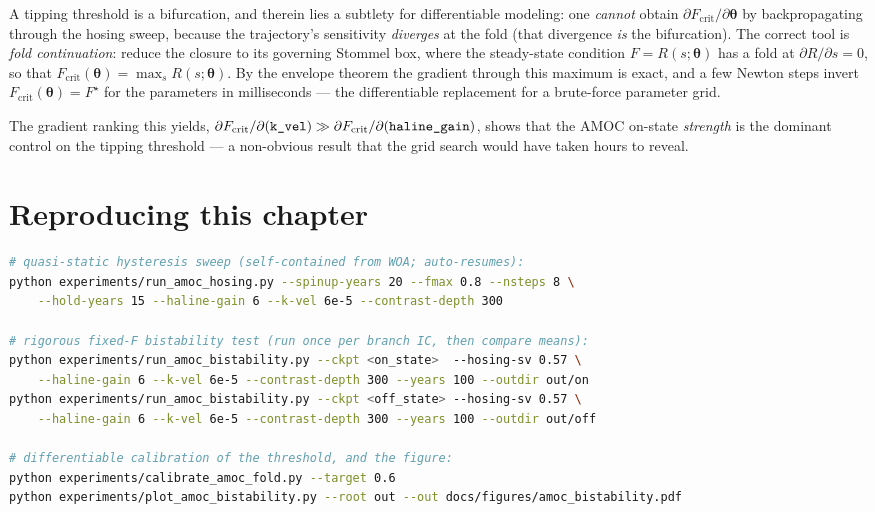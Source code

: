 A tipping threshold is a bifurcation, and therein lies a subtlety for differentiable modeling:
one \emph{cannot} obtain $\partial F_{\mathrm{crit}}/\partial\boldsymbol{\theta}$ by
backpropagating through the hosing sweep, because the trajectory's sensitivity \emph{diverges} at
the fold (that divergence \emph{is} the bifurcation). The correct tool is \emph{fold
continuation}: reduce the closure to its governing Stommel box, where the steady-state condition
$F = R(s;\boldsymbol{\theta})$ has a fold at $\partial R/\partial s=0$, so that
$F_{\mathrm{crit}}(\boldsymbol{\theta}) = \max_s R(s;\boldsymbol{\theta})$. By the envelope
theorem the gradient through this maximum is exact, and a few Newton steps invert
$F_{\mathrm{crit}}(\boldsymbol{\theta})=F^\star$ for the parameters in milliseconds --- the
differentiable replacement for a brute-force parameter grid.

\noindent
The gradient ranking this yields,
$\partial F_{\mathrm{crit}}/\partial(\texttt{k\_vel}) \gg
 \partial F_{\mathrm{crit}}/\partial(\texttt{haline\_gain})$,
shows that the AMOC on-state \emph{strength} is the dominant control on the tipping threshold ---
a non-obvious result that the grid search would have taken hours to reveal.

\section{Reproducing this chapter}

\begin{lstlisting}[language=bash,caption={Hosing sweep, bistability test, and figure.}]
# quasi-static hysteresis sweep (self-contained from WOA; auto-resumes):
python experiments/run_amoc_hosing.py --spinup-years 20 --fmax 0.8 --nsteps 8 \
    --hold-years 15 --haline-gain 6 --k-vel 6e-5 --contrast-depth 300

# rigorous fixed-F bistability test (run once per branch IC, then compare means):
python experiments/run_amoc_bistability.py --ckpt <on_state>  --hosing-sv 0.57 \
    --haline-gain 6 --k-vel 6e-5 --contrast-depth 300 --years 100 --outdir out/on
python experiments/run_amoc_bistability.py --ckpt <off_state> --hosing-sv 0.57 \
    --haline-gain 6 --k-vel 6e-5 --contrast-depth 300 --years 100 --outdir out/off

# differentiable calibration of the threshold, and the figure:
python experiments/calibrate_amoc_fold.py --target 0.6
python experiments/plot_amoc_bistability.py --root out --out docs/figures/amoc_bistability.pdf
\end{lstlisting}

